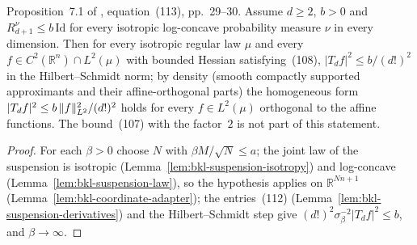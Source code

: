 \begin{lemma}
  \label{lem:bkl-suspension-taylor-bound}
  \leanok
  Proposition~7.1 of \cite{BizeulKlartagLehec2026}, equation~(113), pp.~29--30. Assume $d\ge2$, $b>0$ and $R^\nu_{d+1}\le b\,\mathrm{Id}$ for every isotropic
  log-concave probability measure $\nu$ in every dimension. Then for every isotropic regular law
  $\mu$ and every $f\in C^2(\mathbb R^n)\cap L^2(\mu)$ with bounded Hessian satisfying~(108),
  $|T_df|^2\le b/(d!)^2$ in the Hilbert--Schmidt norm; by density (smooth compactly supported
  approximants and their affine-orthogonal parts) the homogeneous form
  $|T_df|^2\le b\,\lVert f\rVert_{L^2}^2/(d!)^2$ holds for every $f\in L^2(\mu)$ orthogonal to the affine
  functions. The bound~(107) with the factor~$2$ is not part of this statement.
\end{lemma}
\begin{proof}
  \leanok
  For each $\beta>0$ choose $N$ with $\beta M/\sqrt N\le a$; the joint law of the suspension is
  isotropic (Lemma~\ref{lem:bkl-suspension-isotropy}) and log-concave
  (Lemma~\ref{lem:bkl-suspension-law}), so the hypothesis applies on $\mathbb R^{Nn+1}$
  (Lemma~\ref{lem:bkl-coordinate-adapter}); the entries~(112)
  (Lemma~\ref{lem:bkl-suspension-derivatives}) and the Hilbert--Schmidt step give
  $(d!)^2\sigma_\beta^{-2}|T_df|^2\le b$, and $\beta\to\infty$.
\end{proof}

